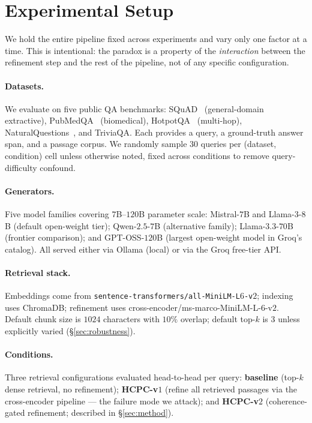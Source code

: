 \section{Experimental Setup}
\label{sec:setup}

We hold the entire pipeline fixed across experiments and vary only one
factor at a time. This is intentional: the paradox is a property of the
\emph{interaction} between the refinement step and the rest of the
pipeline, not of any specific configuration.

\paragraph{Datasets.}
We evaluate on five public QA benchmarks: SQuAD~\citep{rajpurkar2016squad}
(general-domain extractive), PubMedQA~\citep{jin2019pubmedqa}
(biomedical), HotpotQA~\citep{yang2018hotpotqa} (multi-hop),
NaturalQuestions~\citep{kwiatkowski2019nq}, and TriviaQA. Each provides
a query, a ground-truth answer span, and a passage corpus. We
randomly sample $30$ queries per (dataset, condition) cell unless
otherwise noted, fixed across conditions to remove query-difficulty
confound.

\paragraph{Generators.}
Five model families covering $7$B--$120$B parameter scale: Mistral-$7$B
and Llama-$3$-$8$B (default open-weight tier); Qwen-$2.5$-$7$B
(alternative family); Llama-$3.3$-$70$B (frontier comparison); and
GPT-OSS-$120$B (largest open-weight model in Groq's catalog). All
served either via Ollama (local) or via the Groq free-tier API.

\paragraph{Retrieval stack.}
Embeddings come from \texttt{sentence-transformers/all-MiniLM-L$6$-v$2$};
indexing uses ChromaDB; refinement uses cross-encoder/ms-marco-MiniLM-L-$6$-v$2$.
Default chunk size is $1024$ characters with $10\%$ overlap; default top-$k$
is $3$ unless explicitly varied (\S\ref{sec:robustness}).

\paragraph{Conditions.}
Three retrieval configurations evaluated head-to-head per query:
\textbf{baseline} (top-$k$ dense retrieval, no refinement);
\textbf{HCPC-v$1$} (refine all retrieved passages via the cross-encoder
pipeline --- the failure mode we attack); and
\textbf{HCPC-v$2$} (coherence-gated refinement; described in
\S\ref{sec:method}).


